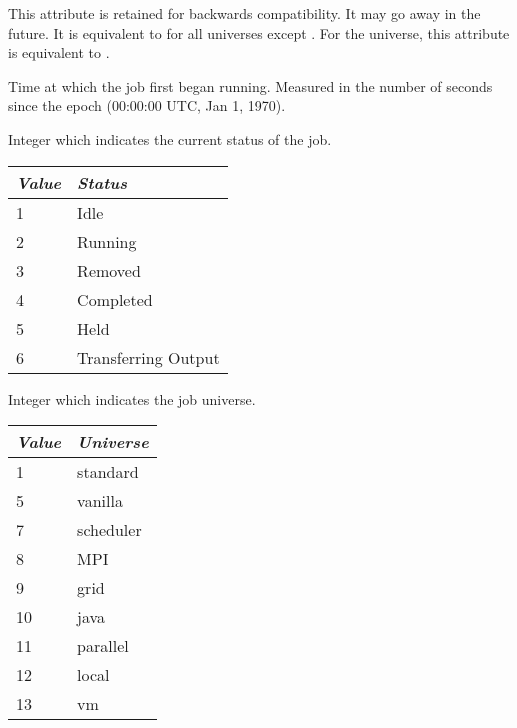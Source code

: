 \begin{description}
\item[\AdAttr{JobRunCount}:]  This attribute is retained for backwards
  compatibility.  It may go away in the future.  It is equivalent to
   for all universes except .
  For the  universe, this attribute is equivalent to
  .

\item[\AdAttr{JobStartDate}:]  Time at which the job first began
running.  Measured in the
number of seconds since the epoch (00:00:00 UTC, Jan 1, 1970).

\item[\AdAttr{JobStatus}:]  Integer which indicates the current
status of the job.
\begin{center}
\begin{table}[hbt]
\begin{tabular}{|p{2cm}p{10cm}|} \hline
\emph{Value} & \emph{Status} \\ \hline \hline
1 & Idle \\ \hline
2 & Running \\ \hline
3 & Removed \\ \hline
4 & Completed \\ \hline
5 & Held \\ \hline
6 & Transferring Output \\ \hline
\end{tabular}
\end{table}
\end{center}

\item[\AdAttr{JobUniverse}:]  Integer which indicates the job
universe.

\begin{center}
\begin{table}[hbt]
\begin{tabular}{|p{2cm}p{3cm}|} \hline
\emph{Value} & \emph{Universe} \\ \hline \hline
1 & standard \\ \hline
5 & vanilla \\ \hline
7 & scheduler \\ \hline
8 & MPI \\ \hline
9 & grid \\ \hline
10 & java \\ \hline
11 & parallel \\ \hline
12 & local \\ \hline
13 & vm \\ \hline
\end{tabular}
\end{table}
\end{center}


\end{description}
